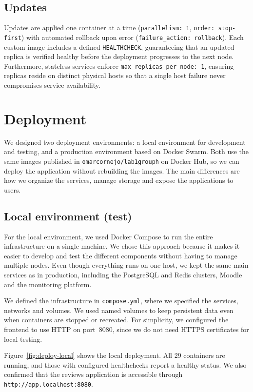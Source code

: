 \documentclass[11pt,a4paper]{article}
\begin{document}
\subsection{Updates}

Updates are applied one container at a time (\texttt{parallelism: 1}, \texttt{order: stop-first}) with automated rollback upon error (\texttt{failure\_action: rollback}). Each custom image includes a defined \texttt{HEALTHCHECK}, guaranteeing that an updated replica is verified healthy before the deployment progresses to the next node. Furthermore, stateless services enforce \texttt{max\_replicas\_per\_node: 1}, ensuring replicas reside on distinct physical hosts so that a single host failure never compromises service availability.


\FloatBarrier
\clearpage
\section{Deployment}

We designed two deployment environments: a local environment for development
and testing, and a production environment based on Docker Swarm. Both use the
same images published in \texttt{omarcornejo/lab1grouph} on Docker Hub,
so we can deploy the application without rebuilding the images.
The main differences are how we organize the services, manage storage
and expose the applications to users.

\subsection{Local environment (test)}

For the local environment, we used Docker Compose to run the entire
infrastructure on a single machine. We chose this approach because it
makes it easier to develop and test the different components without
having to manage multiple nodes. Even though everything runs on one
host, we kept the same main services as in production, including the
PostgreSQL and Redis clusters, Moodle and the monitoring platform.

We defined the infrastructure in \texttt{compose.yml}, where we specified
the services, networks and volumes. We used named volumes to keep
persistent data even when containers are stopped or recreated.
For simplicity, we configured the frontend to use HTTP on port~8080,
since we do not need HTTPS certificates for local testing.

Figure~\ref{fig:deploy-local} shows the local deployment. All 29
containers are running, and those with configured healthchecks
report a healthy status. We also confirmed that the reviews application
is accessible through \texttt{http://app.localhost:8080}.
\end{document}
